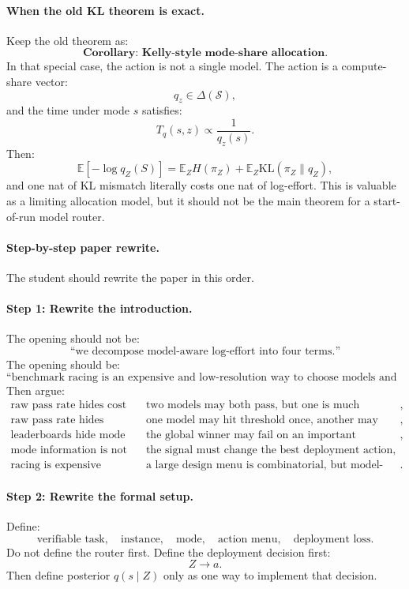 \documentclass{article}
\providecommand{\KL}{\mathrm{KL}}
\begin{document}
\paragraph{When the old KL theorem is exact.}
Keep the old theorem as:
\[
    \textbf{Corollary: Kelly-style mode-share allocation.}
\]
In that special case, the action is not a single model.
The action is a compute-share vector:
\[
    q_z\in\Delta(\mathcal S),
\]
and the time under mode \(s\) satisfies:
\[
    T_q(s,z)\propto \frac{1}{q_z(s)}.
\]
Then:
\[
    \mathbb E[-\log q_Z(S)]
    =
    \mathbb E_ZH(\pi_Z)+\mathbb E_Z\KL(\pi_Z\|q_Z),
\]
and one nat of KL mismatch literally costs one nat of log-effort.
This is valuable as a limiting allocation model, but it should not be the main theorem for
a start-of-run model router.

\paragraph{Step-by-step paper rewrite.}
The student should rewrite the paper in this order.

\paragraph{Step 1: Rewrite the introduction.}
The opening should not be:
\[
    \text{``we decompose model-aware log-effort into four terms.''}
\]
The opening should be:
\[
    \text{``benchmark racing is an expensive and low-resolution way to choose
    models and harnesses for verifier-backed agents.''}
\]
Then argue:
\[
\begin{array}{ll}
    \text{raw pass rate hides cost} &
    \text{two models may both pass, but one is much cheaper or faster},\\
    \text{raw pass rate hides persistence} &
    \text{one model may hit threshold once, another may stay above threshold},\\
    \text{leaderboards hide mode structure} &
    \text{the global winner may fail on an important submode},\\
    \text{mode information is not enough} &
    \text{the signal must change the best deployment action},\\
    \text{racing is expensive} &
    \text{a large design menu is combinatorial, but model-mode cells are reusable}.
\end{array}
\]

\paragraph{Step 2: Rewrite the formal setup.}
Define:
\[
    \text{verifiable task},\quad
    \text{instance},\quad
    \text{mode},\quad
    \text{action menu},\quad
    \text{deployment loss}.
\]
Do not define the router first.
Define the deployment decision first:
\[
    Z \longrightarrow a.
\]
Then define posterior \(q(s\mid Z)\) only as one way to implement that decision.
\end{document}
